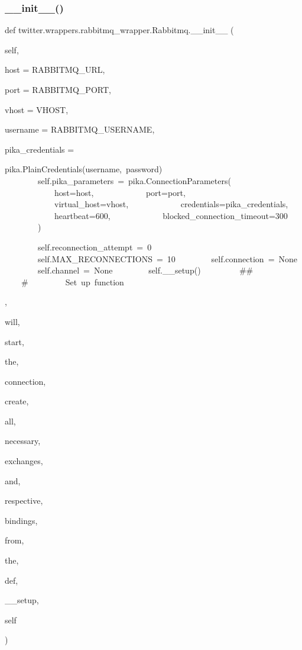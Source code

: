\subsubsection{\texorpdfstring{\+\_\+\+\_\+init\+\_\+\+\_\+()}{\_\_init\_\_()}}
{\footnotesize\ttfamily def twitter.\+wrappers.\+rabbitmq\+\_\+wrapper.\+Rabbitmq.\+\_\+\+\_\+init\+\_\+\+\_\+ (\begin{DoxyParamCaption}\item[{}]{self,  }\item[{}]{host = {\ttfamily RABBITMQ\+\_\+URL},  }\item[{}]{port = {\ttfamily RABBITMQ\+\_\+PORT},  }\item[{}]{vhost = {\ttfamily VHOST},  }\item[{}]{username = {\ttfamily RABBITMQ\+\_\+USERNAME},  }\item[{}]{pika\+\_\+credentials = {\ttfamily pika.PlainCredentials(username,~password)
~~~~~~~~self.pika\+\_\+parameters~=~pika.ConnectionParameters(
~~~~~~~~~~~~host=host,
~~~~~~~~~~~~port=port,
~~~~~~~~~~~~virtual\+\_\+host=vhost,
~~~~~~~~~~~~credentials=pika\+\_\+credentials,
~~~~~~~~~~~~heartbeat=600,
~~~~~~~~~~~~blocked\+\_\+connection\+\_\+timeout=300
~~~~~~~~)

~~~~~~~~self.reconnection\+\_\+attempt~=~0
~~~~~~~~self.MAX\+\_\+RECONNECTIONS~=~10
~~~~~~~~self.connection~=~None
~~~~~~~~self.channel~=~None
~~~~~~~~self.\+\_\+\+\_\+setup()
~~~~
~~~~\#\#~~~~~~~~~
~~~~\#~~~~~~~~~Set~up~function},  }\item[{}]{will,  }\item[{}]{start,  }\item[{}]{the,  }\item[{}]{connection,  }\item[{}]{create,  }\item[{}]{all,  }\item[{}]{necessary,  }\item[{}]{exchanges,  }\item[{}]{and,  }\item[{}]{respective,  }\item[{}]{bindings,  }\item[{}]{from,  }\item[{}]{the,  }\item[{}]{def,  }\item[{}]{\+\_\+\+\_\+setup,  }\item[{}]{self }\end{DoxyParamCaption})}



